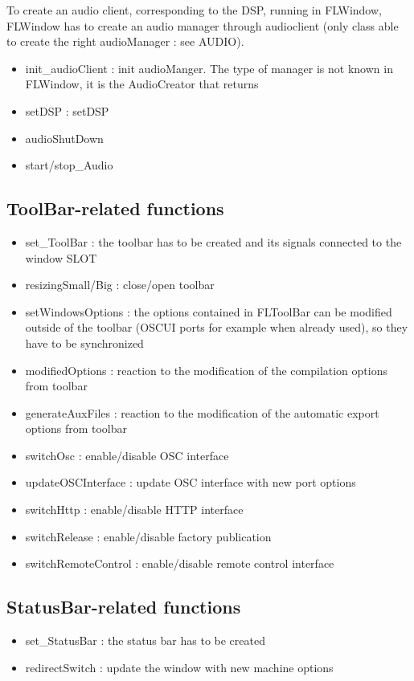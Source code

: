 \documentclass[a4paper]{article}
\begin{document}
To create an audio client, corresponding to the DSP, running in FLWindow, FLWindow has to create an audio manager through audioclient (only class able to create the right audioManager : see AUDIO).

\begin{itemize}
\item init\_audioClient : init audioManger. The type of manager is not known in FLWindow, it is the AudioCreator that returns 
\item setDSP : setDSP 
\item audioShutDown
\item start/stop\_Audio

\end{itemize}
\subsection{ToolBar-related functions}

\begin{itemize}
\item set\_ToolBar : the toolbar has to be created and its signals connected to the window SLOT
\item resizingSmall/Big : close/open toolbar
\item setWindowsOptions : the options contained in FLToolBar can be modified outside of the toolbar (OSCUI ports for example when already used), so they have to be synchronized
\item modifiedOptions : reaction to the modification of the compilation options from toolbar
\item generateAuxFiles : reaction to the modification of the automatic export options from toolbar
\item switchOsc : enable/disable OSC interface
\item updateOSCInterface : update OSC interface with new port options
\item switchHttp : enable/disable HTTP interface
\item switchRelease : enable/disable factory publication
\item switchRemoteControl : enable/disable remote control interface
\end{itemize}

\subsection{StatusBar-related functions}

\begin{itemize}
\item set\_StatusBar : the status bar has to be created
\item redirectSwitch : update the window with new machine options
\end{itemize}
\end{document}

